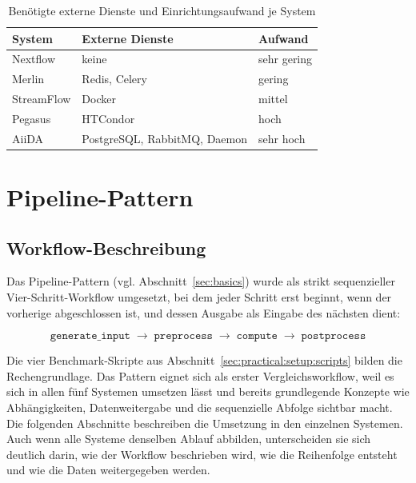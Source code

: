 \begin{table}[ht]
  \caption{Benötigte externe Dienste und Einrichtungsaufwand je System}
  \label{tab:practical:setup}
  \centering
  \begin{tabular}{lll}
    \hline
    \textbf{System} & \textbf{Externe Dienste} & \textbf{Aufwand} \\
    \hline
    Nextflow   & keine                              & sehr gering \\
    Merlin     & Redis, Celery                      & gering \\
    StreamFlow & Docker                             & mittel \\
    Pegasus    & HTCondor                           & hoch \\
    AiiDA      & PostgreSQL, RabbitMQ, Daemon       & sehr hoch \\
    \hline
  \end{tabular}
\end{table}

\section{Pipeline-Pattern}
\label{sec:practical:pipeline}

\subsection{Workflow-Beschreibung}
\label{sec:practical:pipeline:description}

Das Pipeline-Pattern (vgl. Abschnitt~\ref{sec:basics}) wurde als strikt sequenzieller
Vier-Schritt-Workflow umgesetzt, bei dem jeder Schritt erst beginnt, wenn der vorherige
abgeschlossen ist, und dessen Ausgabe als Eingabe des nächsten dient:

\[
  \texttt{generate\_input} \;\rightarrow\; \texttt{preprocess} \;\rightarrow\;
  \texttt{compute} \;\rightarrow\; \texttt{postprocess}
\]

Die vier Benchmark-Skripte aus Abschnitt~\ref{sec:practical:setup:scripts} bilden die
Rechengrundlage. Das Pattern eignet sich als erster Vergleichsworkflow, weil es sich in allen
fünf Systemen umsetzen lässt und bereits grundlegende Konzepte wie Abhängigkeiten, Datenweitergabe
und die sequenzielle Abfolge sichtbar macht. Die folgenden Abschnitte beschreiben die Umsetzung in
den einzelnen Systemen. Auch wenn alle Systeme denselben Ablauf abbilden, unterscheiden sie sich
deutlich darin, wie der Workflow beschrieben wird, wie die Reihenfolge entsteht und wie die Daten
weitergegeben werden.

